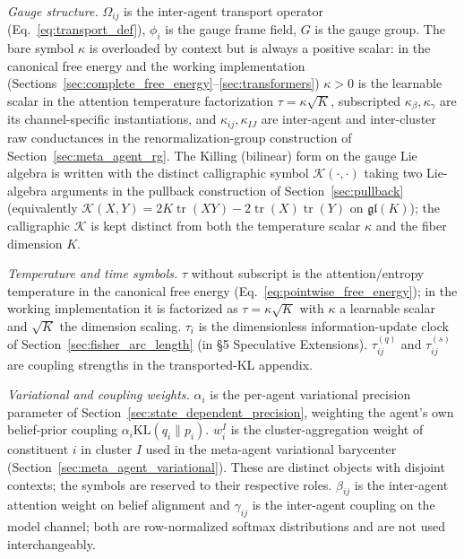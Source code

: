 \documentclass[11pt]{article}
\begin{document}
\emph{Gauge structure.} $\Omega_{ij}$ is the inter-agent transport operator (Eq.~\ref{eq:transport_def}), $\phi_i$ is the gauge frame field, $G$ is the gauge group. The bare symbol $\kappa$ is overloaded by context but is always a positive scalar: in the canonical free energy and the working implementation (Sections~\ref{sec:complete_free_energy}--\ref{sec:transformers}) $\kappa > 0$ is the learnable scalar in the attention temperature factorization $\tau = \kappa\sqrt{K}$, subscripted $\kappa_\beta, \kappa_\gamma$ are its channel-specific instantiations, and $\kappa_{ij}, \kappa_{IJ}$ are inter-agent and inter-cluster raw conductances in the renormalization-group construction of Section~\ref{sec:meta_agent_rg}. The Killing (bilinear) form on the gauge Lie algebra is written with the distinct calligraphic symbol $\mathcal{K}(\cdot,\cdot)$ taking two Lie-algebra arguments in the pullback construction of Section~\ref{sec:pullback} (equivalently $\mathcal{K}(X,Y) = 2K\operatorname{tr}(XY) - 2\operatorname{tr}(X)\operatorname{tr}(Y)$ on $\mathfrak{gl}(K)$); the calligraphic $\mathcal{K}$ is kept distinct from both the temperature scalar $\kappa$ and the fiber dimension $K$.

\emph{Temperature and time symbols.} $\tau$ without subscript is the attention/entropy temperature in the canonical free energy (Eq.~\ref{eq:pointwise_free_energy}); in the working implementation it is factorized as $\tau = \kappa \sqrt{K}$ with $\kappa$ a learnable scalar and $\sqrt{K}$ the dimension scaling. $\tau_i$ is the dimensionless information-update clock of Section~\ref{sec:fisher_arc_length} (in §5 Speculative Extensions). $\tau^{(q)}_{ij}$ and $\tau^{(s)}_{ij}$ are coupling strengths in the transported-KL appendix.

\emph{Variational and coupling weights.} $\alpha_i$ is the per-agent variational precision parameter of Section~\ref{sec:state_dependent_precision}, weighting the agent's own belief-prior coupling $\alpha_i \mathrm{KL}(q_i \| p_i)$. $w_i^I$ is the cluster-aggregation weight of constituent $i$ in cluster $I$ used in the meta-agent variational barycenter (Section~\ref{sec:meta_agent_variational}). These are distinct objects with disjoint contexts; the symbols are reserved to their respective roles. $\beta_{ij}$ is the inter-agent attention weight on belief alignment and $\gamma_{ij}$ is the inter-agent coupling on the model channel; both are row-normalized softmax distributions and are not used interchangeably.
\end{document}
